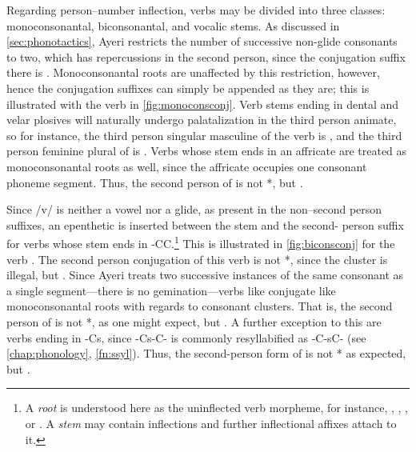 Regarding person--number inflection, verbs may be divided into three classes: 
monoconsonantal, biconsonantal, and vocalic stems. As discussed in 
\autoref{sec:phonotactics}, Ayeri restricts the number of successive non-glide 
consonants to two, which has repercussions in the second person, since the 
conjugation suffix there is . Monoconsonantal roots are 
unaffected by this restriction, however, hence the conjugation suffixes can 
simply be appended as they are; this is illustrated with the verb 
 in \autoref{fig:monoconsconj}. Verb stems 
ending in dental and velar plosives will naturally undergo palatalization in 
the third person animate, so for instance, the third person singular masculine 
of the verb  is , and the third person feminine plural of  is . Verbs whose 
stem ends in an affricate are treated as monoconsonantal roots as well, since 
the affricate occupies one consonant phoneme segment. Thus, the second 
person of  is not *, but 
.

Since /v/ is neither a vowel nor a glide, as present in the non–second person
suffixes, an epenthetic  is inserted between the stem and the second-
person suffix for verbs whose stem ends in -CC.\footnote{A
\emph{root} is understood here as the uninflected verb morpheme, for instance,
, , , or
. A \emph{stem} may contain inflections and further
inflectional affixes attach to it.} This is illustrated in
\autoref{fig:biconsconj} for the verb . The second
person conjugation of this verb is not *, since the
cluster  is illegal, but . Since Ayeri treats two
successive instances of the same consonant as a single segment---there is no
gemination---verbs like  conjugate like
monoconsonantal roots with regards to consonant clusters. That is, the second
person of  is not *, as one might
expect, but . A further exception to this are verbs
ending in -Cs, since -Cs-C- is commonly resyllabified as -C-sC- (see
\autoref{chap:phonology}, \autoref{fn:ssyl}). Thus, the second-person form of
 is not * as expected, but
.

